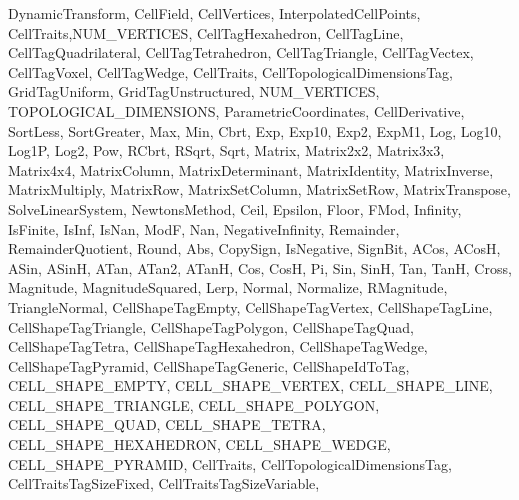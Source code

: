 {{                   DynamicTransform,
                   CellField, CellVertices,
                   InterpolatedCellPoints,
                   CellTraits,NUM_VERTICES,
                   CellTagHexahedron, CellTagLine, CellTagQuadrilateral,
                   CellTagTetrahedron, CellTagTriangle, CellTagVectex,
                   CellTagVoxel, CellTagWedge,
                   CellTraits,
                   CellTopologicalDimensionsTag,
                   GridTagUniform, GridTagUnstructured,
                   NUM_VERTICES, TOPOLOGICAL_DIMENSIONS,
                   ParametricCoordinates, CellDerivative,
                   SortLess, SortGreater,
                   Max, Min,
                   Cbrt, Exp, Exp10, Exp2, ExpM1, Log, Log10, Log1P, Log2,
                   Pow, RCbrt, RSqrt, Sqrt,
                   Matrix, Matrix2x2, Matrix3x3, Matrix4x4,
                   MatrixColumn, MatrixDeterminant, MatrixIdentity,
                   MatrixInverse, MatrixMultiply, MatrixRow,
                   MatrixSetColumn, MatrixSetRow, MatrixTranspose,
                   SolveLinearSystem,
                   NewtonsMethod,
                   Ceil, Epsilon, Floor, FMod, Infinity, IsFinite, IsInf,
                   IsNan, ModF, Nan, NegativeInfinity, Remainder,
                   RemainderQuotient, Round,
                   Abs, CopySign, IsNegative, SignBit,
                   ACos, ACosH, ASin, ASinH, ATan, ATan2, ATanH, Cos, CosH,
                   Pi, Sin, SinH, Tan, TanH,
                   Cross, Magnitude, MagnitudeSquared, Lerp, Normal,
                   Normalize, RMagnitude, TriangleNormal,
                   CellShapeTagEmpty,
                   CellShapeTagVertex,
                   CellShapeTagLine,
                   CellShapeTagTriangle,
                   CellShapeTagPolygon,
                   CellShapeTagQuad,
                   CellShapeTagTetra,
                   CellShapeTagHexahedron,
                   CellShapeTagWedge,
                   CellShapeTagPyramid,
                   CellShapeTagGeneric,
                   CellShapeIdToTag,
                   CELL_SHAPE_EMPTY,
                   CELL_SHAPE_VERTEX,
                   CELL_SHAPE_LINE,
                   CELL_SHAPE_TRIANGLE,
                   CELL_SHAPE_POLYGON,
                   CELL_SHAPE_QUAD,
                   CELL_SHAPE_TETRA,
                   CELL_SHAPE_HEXAHEDRON,
                   CELL_SHAPE_WEDGE,
                   CELL_SHAPE_PYRAMID,
                   CellTraits,
                   CellTopologicalDimensionsTag,
                   CellTraitsTagSizeFixed,
                   CellTraitsTagSizeVariable,
}}
